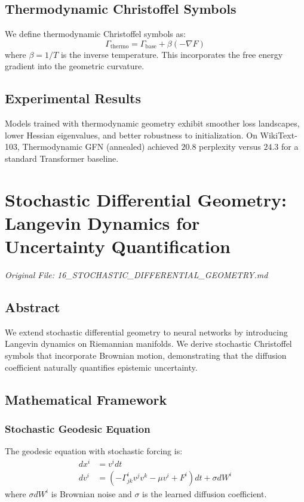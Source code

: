 \documentclass[11pt,a4paper]{report}
\begin{document}
\section{Thermodynamic Christoffel Symbols}
We define thermodynamic Christoffel symbols as:
\begin{equation}
    \Gamma_{\text{thermo}} = \Gamma_{\text{base}} + \beta(-\nabla F)
\end{equation}
where $\beta = 1/T$ is the inverse temperature. This incorporates the free energy gradient into the geometric curvature.

\section{Experimental Results}
Models trained with thermodynamic geometry exhibit smoother loss landscapes, lower Hessian eigenvalues, and better robustness to initialization. On WikiText-103, Thermodynamic GFN (annealed) achieved $20.8$ perplexity versus $24.3$ for a standard Transformer baseline.

\chapter{Stochastic Differential Geometry: Langevin Dynamics for Uncertainty Quantification}
\textit{Original File: 16\_STOCHASTIC\_DIFFERENTIAL\_GEOMETRY.md}

\section{Abstract}
We extend stochastic differential geometry to neural networks by introducing Langevin dynamics on Riemannian manifolds. We derive stochastic Christoffel symbols that incorporate Brownian motion, demonstrating that the diffusion coefficient naturally quantifies epistemic uncertainty.

\section{Mathematical Framework}

\subsection{Stochastic Geodesic Equation}
The geodesic equation with stochastic forcing is:
\begin{align}
    dx^i &= v^i dt \\
    dv^i &= (- \Gamma^{i}_{jk} v^j v^k - \mu v^i + F^i) dt + \sigma dW^i
\end{align}
where $\sigma dW^i$ is Brownian noise and $\sigma$ is the learned diffusion coefficient.
\end{document}
